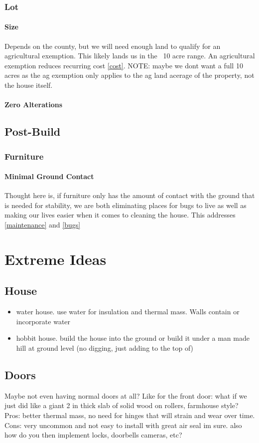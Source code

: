 \documentclass{article}
\begin{document}
\subsubsection{Lot}
\paragraph{Size}
Depends on the county, but we will need enough land to qualify for an agricultural exemption. This likely lands us in the ~10 acre range. An agricultural exemption reduces recurring cost \ref{cost}. NOTE: maybe we dont want a full 10 acres as the ag exemption only applies to the ag land acerage of the property, not the house itself.
\paragraph{Zero Alterations}

\subsection{Post-Build}
\subsubsection{Furniture}
\paragraph{Minimal Ground Contact}
Thought here is, if furniture only has the amount of contact with the ground that is needed for stability, we are both eliminating places for bugs to live as well as making our lives easier when it comes to cleaning the house. This addresses \ref{maintenance} and \ref{bugs}

\section{Extreme Ideas}
\subsection{House}
\begin{itemize}
    \item water house. use water for insulation and thermal mass. Walls contain or incorporate water
    \item hobbit house. build the house into the ground or build it under a man made hill at ground level (no digging, just adding to the top of)
\end{itemize}
\subsection{Doors}
Maybe not even having normal doors at all? Like for the front door: what if we just did like a giant 2 in thick slab of solid wood on rollers, farmhouse style? Pros: better thermal mass, no need for hinges that will strain and wear over time. Cons: very uncommon and not easy to install with great air seal im sure. also how do you then implement locks, doorbells cameras, etc?
\end{document}
